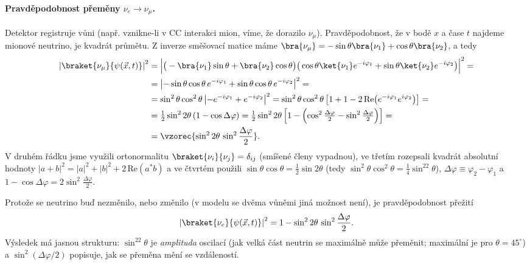 \paragraph{Pravděpodobnost přeměny \(\nu_e\to\nu_\mu\).} Detektor registruje vůni (např. vznikne-li v CC interakci mion, víme, že dorazilo \(\nu_\mu\)). Pravděpodobnost, že v bodě \(x\) a čase \(t\) najdeme mionové neutrino, je kvadrát průmětu. Z inverze směšovací matice máme \(\bra{\nu_\mu}=-\sin\theta\bra{\nu_1}+\cos\theta\bra{\nu_2}\), a tedy
\begin{align}
  \left|\braket{\nu_\mu}{\psi(\vec x,t)}\right|^2
  &=\Big|\big(-\bra{\nu_1}\sin\theta+\bra{\nu_2}\cos\theta\big)\big(\cos\theta\ket{\nu_1}e^{-i\varphi_1}+\sin\theta\ket{\nu_2}e^{-i\varphi_2}\big)\Big|^2=\notag\\
  &=\left|-\sin\theta\cos\theta\,e^{-i\varphi_1}+\sin\theta\cos\theta\,e^{-i\varphi_2}\right|^2=\notag\\
  &=\sin^2\theta\cos^2\theta\left|-e^{-i\varphi_1}+e^{-i\varphi_2}\right|^2
   =\sin^2\theta\cos^2\theta\left[1+1-2\,\mathrm{Re}\!\left(e^{-i\varphi_1}e^{i\varphi_2}\right)\right]=\notag\\
  &=\tfrac12\sin^22\theta\,(1-\cos\Delta\varphi)
   =\tfrac12\sin^22\theta\left[1-\left(\cos^2\tfrac{\Delta\varphi}{2}-\sin^2\tfrac{\Delta\varphi}{2}\right)\right]=\notag\\
  &=\vzorec{\sin^22\theta\,\sin^2\frac{\Delta\varphi}{2}}.
\end{align}
V druhém řádku jsme využili ortonormalitu \(\braket{\nu_i}{\nu_j}=\delta_{ij}\) (smíšené členy vypadnou), ve třetím rozepsali kvadrát absolutní hodnoty \(|a+b|^2=|a|^2+|b|^2+2\,\mathrm{Re}(a^*b)\) a ve čtvrtém použili \(\sin\theta\cos\theta=\frac12\sin2\theta\) (tedy \(\sin^2\theta\cos^2\theta=\frac14\sin^22\theta\)), \(\Delta\varphi\equiv\varphi_2-\varphi_1\) a \(1-\cos\Delta\varphi=2\sin^2\frac{\Delta\varphi}{2}\).

Protože se neutrino buď nezměnilo, nebo změnilo (v modelu se dvěma vůněmi jiná možnost není), je pravděpodobnost přežití
\begin{equation}
  \left|\braket{\nu_e}{\psi(\vec x,t)}\right|^2=1-\sin^22\theta\,\sin^2\frac{\Delta\varphi}{2}.
\end{equation}
Výsledek má jasnou strukturu: \(\sin^22\theta\) je \emph{amplituda} oscilací (jak velká část neutrin se maximálně může přeměnit; maximální je pro \(\theta=45^\circ\)) a \(\sin^2(\Delta\varphi/2)\) popisuje, jak se přeměna mění se vzdáleností.

